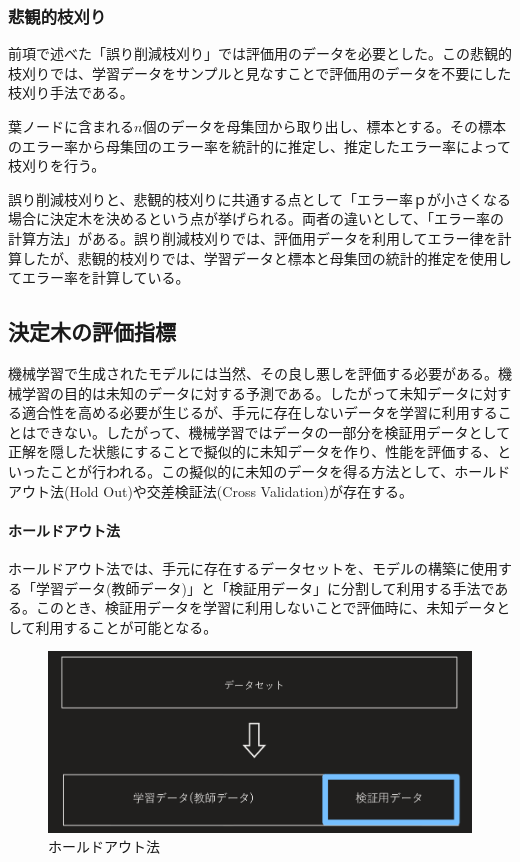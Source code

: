 \documentclass[dvipdfmx]{jsarticle}
\begin{document}
\subsubsection{悲観的枝刈り}
前項で述べた「誤り削減枝刈り」では評価用のデータを必要とした。この悲観的枝刈りでは、学習データをサンプルと見なすことで評価用のデータを不要にした枝刈り手法である。\par
葉ノードに含まれる$n$個のデータを母集団から取り出し、標本とする。その標本のエラー率から母集団のエラー率を統計的に推定し、推定したエラー率によって枝刈りを行う。\par
誤り削減枝刈りと、悲観的枝刈りに共通する点として「エラー率ｐが小さくなる場合に決定木を決めるという点が挙げられる。両者の違いとして、「エラー率の計算方法」がある。誤り削減枝刈りでは、評価用データを利用してエラー律を計算したが、悲観的枝刈りでは、学習データと標本と母集団の統計的推定を使用してエラー率を計算している。
\subsection{決定木の評価指標}
機械学習で生成されたモデルには当然、その良し悪しを評価する必要がある。機械学習の目的は未知のデータに対する予測である。したがって未知データに対する適合性を高める必要が生じるが、手元に存在しないデータを学習に利用することはできない。したがって、機械学習ではデータの一部分を検証用データとして正解を隠した状態にすることで擬似的に未知データを作り、性能を評価する、といったことが行われる。この擬似的に未知のデータを得る方法として、ホールドアウト法(Hold Out)や交差検証法(Cross Validation)が存在する。\par
\paragraph{ホールドアウト法}\par
ホールドアウト法では、手元に存在するデータセットを、モデルの構築に使用する「学習データ(教師データ)」と「検証用データ」に分割して利用する手法である。このとき、検証用データを学習に利用しないことで評価時に、未知データとして利用することが可能となる。
\begin{figure}[H]
  \centering
  \includegraphics[scale=0.3]{HoldOut.PNG}
  \caption{ホールドアウト法}
\end{figure}
\end{document}

